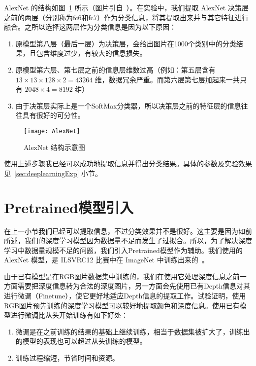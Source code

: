 AlexNet 的结构如图~\ref{fig:AlexNet} 所示（图片引自~）。在实验中，我们提取 AlexNet 决策层之前的两层（分别称为fc6和fc7）作为分类信息，将其提取出来并与其它特征进行融合。之所以选择这两层作为分类信息是因为以下原因：
\begin{enumerate}
\item 原模型第八层（最后一层）为决策层，会给出图片在1000个类别中的分类结果，且包含维度过少，有较大的信息损失。
\item 原模型第六层、第七层之前的信息层维数过高（例如：第五层含有 $13 \times 13 \times 128 \times 2 = 43264$ 维，数据冗余严重。而第六层第七层加起来一共只有 $2048 \times 4 = 8192$ 维）
\item 由于决策层实际上是一个SoftMax分类器，所以决策层之前的特征层的信息往往具有很好的可分性。
\end{enumerate}


\begin{figure}[H] %
  \centering
  \texttt{[image: AlexNet]}
  \caption{AlexNet 结构示意图}
  \label{fig:AlexNet}
\end{figure}

使用上述步骤我已经可以成功地提取信息并得出分类结果。具体的参数及实验效果见~\ref{sec:deeplearningExp} 小节。


\section{Pretrained模型引入}
\label{sec:Pretrained}

在上一小节我们已经可以提取信息，不过分类效果并不是很好。这主要是因为如前所述，我们的深度学习模型因为数据量不足而发生了过拟合。所以，为了解决深度学习中数据量规模不足的问题，我们引入Pretrained模型作为辅助。我们使用的 AlexNet 模型，是 ILSVRC12 比赛中在 ImageNet 中训练出来的~。

由于已有模型是在RGB图片数据集中训练的，我们在使用它处理深度信息之前一方面需要把深度信息转为合法的深度图片，另一方面会先使用已有Depth信息对其进行微调（Finetune），使它更好地适应Depth信息的提取工作。试验证明，使用RGB图片预先训练的深度学习模型可以较好地提取颜色和深度信息。使用已有模型进行微调比从头开始训练有如下好处：

\begin{enumerate}
\item 微调是在之前训练的结果的基础上继续训练，相当于数据集被扩大了，训练出的模型的表现也可以超过从头训练的模型。
\item 训练过程缩短，节省时间和资源。
\end{enumerate}

